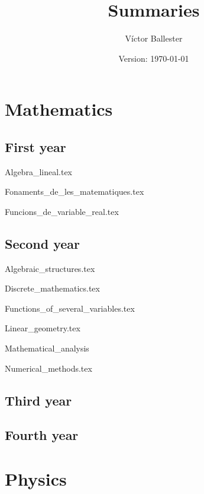 \documentclass{report}
\title{Summaries}
\author{Víctor Ballester}
\date{Version: \today}
\begin{document}
\maketitle
\newpage
\tableofcontents
\newpage
\part{Mathematics}
    \chapter{First year}
        {Algebra_lineal.tex}
        \cleardoublepage
        
        {Fonaments_de_les_matematiques.tex}
        \cleardoublepage
        
        {Funcions_de_variable_real.tex}
        \cleardoublepage
    \chapter{Second year}
        {Algebraic_structures.tex}
        \cleardoublepage
        
        {Discrete_mathematics.tex}
        \cleardoublepage
        
        {Functions_of_several_variables.tex}
        \cleardoublepage
        
        {Linear_geometry.tex}
        \cleardoublepage
        
        {Mathematical_analysis}
        \cleardoublepage
        
        {Numerical_methods.tex}
        \cleardoublepage
    \chapter{Third year}
    \chapter{Fourth year}
\part{Physics}
\end{document}

